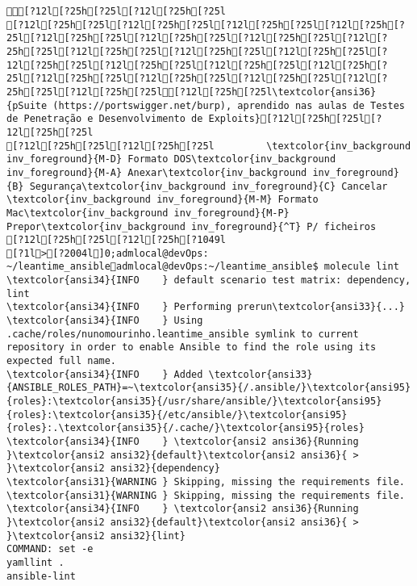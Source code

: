 \documentclass{scrartcl}
\begin{document}
\begin{Verbatim}
[?12l[?25h[?25l[?12l[?25h[?25l
[?12l[?25h[?25l[?12l[?25h[?25l[?12l[?25h[?25l[?12l[?25h[?25l[?12l[?25h[?25l[?12l[?25h[?25l[?12l[?25h[?25l[?12l[?25h[?25l[?12l[?25h[?25l[?12l[?25h[?25l[?12l[?25h[?25l[?12l[?25h[?25l[?12l[?25h[?25l[?12l[?25h[?25l[?12l[?25h[?25l[?12l[?25h[?25l[?12l[?25h[?25l[?12l[?25h[?25l[?12l[?25h[?25l[?12l[?25h[?25l[?12l[?25h[?25l\textcolor{ansi36}{pSuite (https://portswigger.net/burp), aprendido nas aulas de Testes de Penetração e Desenvolvimento de Exploits}[?12l[?25h[?25l[?12l[?25h[?25l
[?12l[?25h[?25l[?12l[?25h[?25l         \textcolor{inv_background inv_foreground}{M-D} Formato DOS\textcolor{inv_background inv_foreground}{M-A} Anexar\textcolor{inv_background inv_foreground}{B} Segurança\textcolor{inv_background inv_foreground}{C} Cancelar           \textcolor{inv_background inv_foreground}{M-M} Formato Mac\textcolor{inv_background inv_foreground}{M-P} Prepor\textcolor{inv_background inv_foreground}{^T} P/ ficheiros
[?12l[?25h[?25l[?12l[?25h[?1049l
[?1l>[?2004l]0;admlocal@devOps: ~/leantime_ansibleadmlocal@devOps:~/leantime_ansible$ molecule lint
\textcolor{ansi34}{INFO    } default scenario test matrix: dependency, lint
\textcolor{ansi34}{INFO    } Performing prerun\textcolor{ansi33}{...}
\textcolor{ansi34}{INFO    } Using .cache/roles/nunomourinho.leantime_ansible symlink to current repository in order to enable Ansible to find the role using its expected full name.
\textcolor{ansi34}{INFO    } Added \textcolor{ansi33}{ANSIBLE_ROLES_PATH}=~\textcolor{ansi35}{/.ansible/}\textcolor{ansi95}{roles}:\textcolor{ansi35}{/usr/share/ansible/}\textcolor{ansi95}{roles}:\textcolor{ansi35}{/etc/ansible/}\textcolor{ansi95}{roles}:.\textcolor{ansi35}{/.cache/}\textcolor{ansi95}{roles}
\textcolor{ansi34}{INFO    } \textcolor{ansi2 ansi36}{Running }\textcolor{ansi2 ansi32}{default}\textcolor{ansi2 ansi36}{ > }\textcolor{ansi2 ansi32}{dependency}
\textcolor{ansi31}{WARNING } Skipping, missing the requirements file.
\textcolor{ansi31}{WARNING } Skipping, missing the requirements file.
\textcolor{ansi34}{INFO    } \textcolor{ansi2 ansi36}{Running }\textcolor{ansi2 ansi32}{default}\textcolor{ansi2 ansi36}{ > }\textcolor{ansi2 ansi32}{lint}
COMMAND: set -e
yamllint .
ansible-lint


\end{Verbatim}
\end{document}
